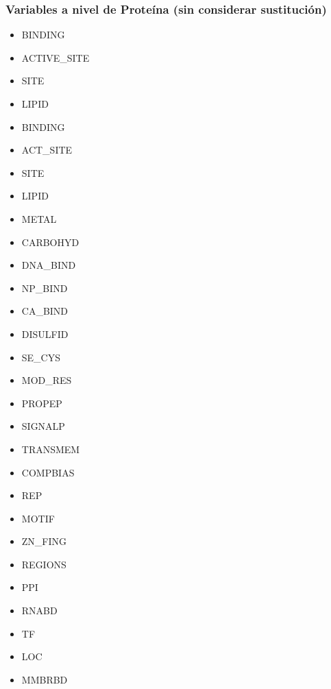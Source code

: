 \subsubsection{Variables a nivel de Proteína (sin considerar sustitución)}

\begin{itemize}
    \item BINDING
    \item ACTIVE\_SITE
    \item SITE
    \item LIPID
    \item BINDING
    \item ACT\_SITE
    \item SITE
    \item LIPID
    \item METAL
    \item CARBOHYD
    \item DNA\_BIND
    \item NP\_BIND
    \item CA\_BIND
    \item DISULFID
    \item SE\_CYS
    \item MOD\_RES
    \item PROPEP
    \item SIGNALP
    \item TRANSMEM
    \item COMPBIAS
    \item REP
    \item MOTIF
    \item ZN\_FING
    \item REGIONS
    \item PPI
    \item RNABD
    \item TF
    \item LOC
    \item MMBRBD
\end{itemize}

